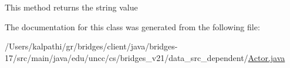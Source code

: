 This method returns the string value 

The documentation for this class was generated from the following file\+:\begin{DoxyCompactItemize}
\item 
/\+Users/kalpathi/gr/bridges/client/java/bridges-\/17/src/main/java/edu/uncc/cs/bridges\+\_\+v21/data\+\_\+src\+\_\+dependent/\mbox{\hyperlink{_actor_8java}{Actor.\+java}}\end{DoxyCompactItemize}
